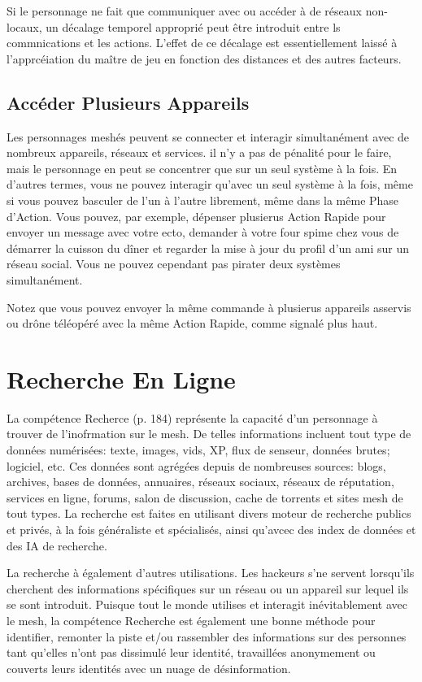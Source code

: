 Si le personnage ne fait que communiquer avec ou accéder à de réseaux non-locaux, un décalage temporel approprié peut être introduit entre ls commnications et les actions. L'effet de ce décalage est essentiellement laissé à l'apprcéiation du maître de jeu en fonction des distances et des autres facteurs. 

\subsection{Accéder Plusieurs Appareils} 

Les personnages meshés peuvent se connecter et interagir simultanément avec de nombreux appareils, réseaux et services. il n'y a pas de pénalité pour le faire, mais le personnage en peut se concentrer que sur un seul système à la fois. En d'autres termes, vous ne pouvez interagir qu'avec un seul système à la fois, même si vous pouvez basculer de l'un à l'autre librement, même dans la même Phase d'Action. Vous pouvez, par exemple, dépenser plusierus Action Rapide pour envoyer un message avec votre ecto, demander à votre four spime chez vous de démarrer la cuisson du dîner et regarder la mise à jour du profil d'un ami sur un réseau social. Vous ne pouvez cependant pas pirater deux systèmes simultanément. 

Notez que vous pouvez envoyer la même commande à plusierus appareils asservis ou drône téléopéré avec la même Action Rapide, comme signalé plus haut. 

\section{Recherche En Ligne} 

La compétence Recherce (p. 184) représente la capacité d'un personnage à trouver de l'inofrmation sur le mesh. De telles informations incluent tout type de données numérisées: texte, images, vids, XP, flux de senseur, données brutes; logiciel, etc. Ces données sont agrégées depuis de nombreuses sources: blogs, archives, bases de données, annuaires, réseaux sociaux, réseaux de réputation, services en ligne, forums, salon de discussion, cache de torrents et sites mesh de tout types. La recherche est faites en utilisant divers moteur de recherche publics et privés, à la fois généraliste et spécialisés, ainsi qu'avcec des index de données et des IA de recherche. 

La recherche à également d'autres utilisations. Les hackeurs s'ne servent lorsqu'ils cherchent des informations spécifiques sur un réseau ou un appareil sur lequel ils se sont introduit. Puisque tout le monde utilises et interagit inévitablement avec le mesh, la compétence Recherche est également une bonne méthode pour identifier, remonter la piste et/ou rassembler des informations sur des personnes tant qu'elles n'ont pas dissimulé leur identité, travaillées anonymement ou couverts leurs identités avec un nuage de désinformation. 

